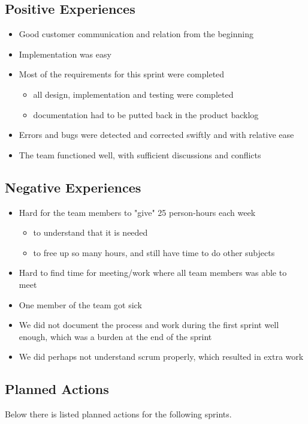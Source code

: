 \subsection{Positive Experiences}
\begin{itemize}
	\item Good customer communication and relation from the beginning
	\item Implementation was easy
	\item Most of the requirements for this sprint were completed
	\begin{itemize} 
		\item all design, implementation and testing were completed
		\item documentation had to be putted back in the product backlog 
	\end{itemize}
	\item Errors and bugs were detected and corrected swiftly and with relative ease
	\item The team functioned well, with sufficient discussions and conflicts
\end{itemize}

\subsection{Negative Experiences}
\begin{itemize}
	\item Hard for the team members to "give" 25 person-hours each week
	\begin{itemize}
		\item to understand that it is needed
		\item to free up so many hours, and still have time to do other subjects
	\end{itemize}
	\item Hard to find time for meeting/work where all team members was able to meet
	\item One member of the team got sick
	\item We did not document the process and work during the first sprint well enough, which was a burden at the end of the sprint
	\item We did perhaps not understand scrum properly, which resulted in extra work
\end{itemize}

\subsection{Planned Actions}
Below there is listed planned actions for the following sprints.

